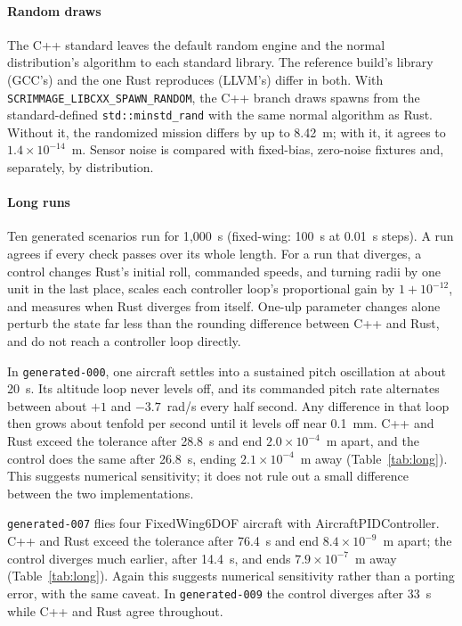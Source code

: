 \documentclass[conference]{IEEEtran}
\begin{document}
\paragraph{Random draws}
The C++ standard leaves the default random engine and the normal
distribution's algorithm to each standard library. The reference build's
library (GCC's) and the one Rust reproduces (LLVM's) differ in both. With
\texttt{SCRIMMAGE\_LIBCXX\_SPAWN\_RANDOM}, the C++ branch draws spawns from the
standard-defined \texttt{std::minstd\_rand} with the same normal algorithm as
Rust. Without it, the randomized mission differs by up to 8.42~m; with it, it
agrees to $1.4\times10^{-14}$~m. Sensor noise is compared with
fixed-bias, zero-noise fixtures and, separately, by distribution.

\paragraph{Long runs}
Ten generated scenarios run for 1{,}000~s (fixed-wing: 100~s at 0.01~s steps).
A run agrees if every check passes over its whole length. For a run that
diverges, a control changes Rust's initial roll, commanded speeds, and turning
radii by one unit in the last place, scales each controller loop's proportional
gain by $1+10^{-12}$, and measures when Rust diverges from itself. One-ulp
parameter changes alone perturb the state far less than the rounding difference
between C++ and Rust, and do not reach a controller loop directly.

In \texttt{generated-000}, one aircraft settles into a sustained pitch
oscillation at about 20~s. Its altitude loop never levels off, and its commanded
pitch rate alternates between about $+1$ and $-3.7$~rad/s every half second.
Any difference in that loop then grows about tenfold per second until it levels
off near 0.1~mm. C++ and Rust exceed the tolerance after 28.8~s and end
$2.0\times10^{-4}$~m apart, and the control does the same after 26.8~s,
ending $2.1\times10^{-4}$~m away (Table~\ref{tab:long}). This suggests
numerical sensitivity; it does not rule out a small difference between the two
implementations.

\texttt{generated-007} flies four FixedWing6DOF aircraft with
AircraftPIDController. C++ and Rust exceed the tolerance after 76.4~s and end
$8.4\times10^{-9}$~m apart; the control diverges much earlier, after 14.4~s,
and ends $7.9\times10^{-7}$~m away (Table~\ref{tab:long}). Again this
suggests numerical sensitivity rather than a porting error, with the same
caveat. In \texttt{generated-009} the control diverges after 33~s while C++
and Rust agree throughout.
\end{document}
